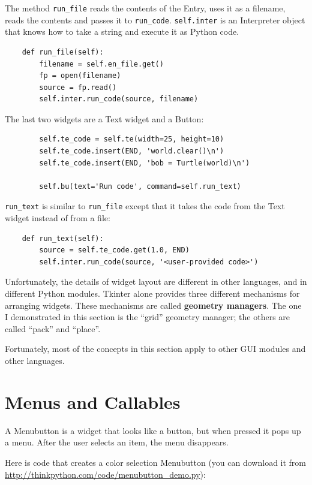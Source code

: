 \documentclass[10pt]{book}
\begin{document}
The method \verb"run_file" reads the contents of the Entry,
uses it as a filename, reads the contents
and passes it to \verb"run_code".  {\tt self.inter} is an
Interpreter object that knows how to take a string and
execute it as Python code.

\begin{verbatim}
    def run_file(self):
        filename = self.en_file.get()
        fp = open(filename)
        source = fp.read()
        self.inter.run_code(source, filename)
\end{verbatim}
%
The last two widgets are a Text widget and a Button:

\begin{verbatim}
        self.te_code = self.te(width=25, height=10)
        self.te_code.insert(END, 'world.clear()\n')
        self.te_code.insert(END, 'bob = Turtle(world)\n')

        self.bu(text='Run code', command=self.run_text)
\end{verbatim}
%
\verb"run_text" is similar to \verb"run_file" except that it takes
the code from the Text widget instead of from a file:

\begin{verbatim}
    def run_text(self):
        source = self.te_code.get(1.0, END)
        self.inter.run_code(source, '<user-provided code>')
\end{verbatim}
%
Unfortunately, the details of widget layout are different in
other languages, and in different Python modules.
Tkinter alone provides three different mechanisms for arranging
widgets.  These mechanisms are called {\bf geometry managers}.
The one I demonstrated in this section is the ``grid'' geometry
manager; the others are called ``pack'' and ``place''.

Fortunately, most of the concepts in this section apply to
other GUI modules and other languages.


\section{Menus and Callables}

A Menubutton is a widget that looks like a button, but when pressed
it pops up a menu.  After the user selects an item, the menu
disappears.

Here is code that creates a color selection Menubutton
(you can download it from \url{http://thinkpython.com/code/menubutton_demo.py}):
\end{document}
